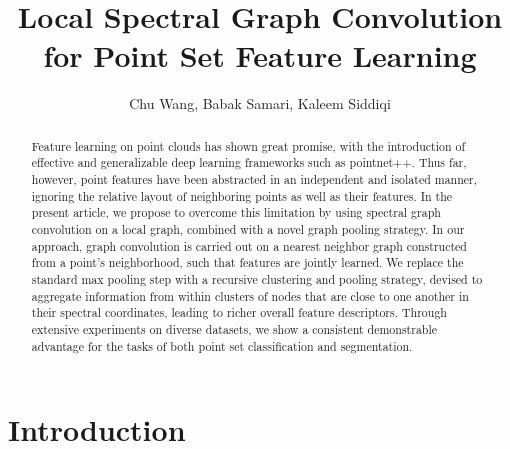 \documentclass[runningheads]{llncs}
\newcommand{\etal}{\textit{et al}. }
\begin{document}
\pagestyle{headings}
\mainmatter

\title{Local Spectral Graph Convolution for Point Set Feature Learning} 



\authorrunning{C. Wang \etal}

\author{Chu Wang, Babak Samari, Kaleem Siddiqi}





\maketitle

\begin{abstract}
Feature learning on point clouds has shown great promise, with the introduction of effective and generalizable deep learning frameworks such as pointnet++. Thus far, however, point features have been abstracted in an independent and isolated manner, ignoring the relative layout of neighboring points as well as their features. In the present article, we propose to overcome this limitation by using spectral graph convolution on a local graph, combined with a novel graph pooling strategy. In our approach, graph convolution is carried out on a nearest neighbor graph constructed from a point's neighborhood, such that features are jointly learned. We replace the standard max pooling step with a recursive clustering and pooling strategy, devised to aggregate information from within clusters of nodes that are close to one another in their spectral coordinates, leading to richer overall feature descriptors. Through extensive experiments on diverse datasets, we show a consistent demonstrable advantage for the tasks of both point set classification and segmentation.

\end{abstract}


\section{Introduction}
\end{document}
